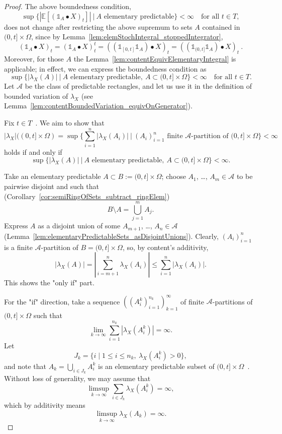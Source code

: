 \begin{proof}
  The above boundedness condition,
\[
\sup
  \Big\{
    |\mathbb{E}[(\mathbb{1}_A \bullet X)_t]|
    \:\Big|\:
    A \text{ elementary predictable}
  \Big\}
  <\infty
  \quad\text{for all } t\in T,
\]
  does not change after restricting the above supremum to sets
  $A$
  contained in $(0, t] \times \Omega$,
  since by
  Lemma~\ref{lem:elemStochIntegral_stoppedIntegrator},
\[
  (\mathbb{1}_A \bullet X)_t
  =
  (\mathbb{1}_A \bullet X)^t_t
  =
  ((\mathbb{1}_{[0, t]}\mathbb{1}_A) \bullet X)_t
  =
  ((\mathbb{1}_{(0, t]}\mathbb{1}_A) \bullet X)_t
  \:.
\]
  Moreover, for those $A$ the Lemma~\ref{lem:contentEquivElementaryIntegral} is applicable;
  in effect, we can express the boundedness condition as
\[
\sup
  \Big\{
    |\lambda_X(A)|
    \:\Big|\:
    A \text{ elementary predictable},\:
    A\subset(0,t]\times\Omega
  \Big\}
  <\infty
  \quad\text{for all } t\in T.
\]
  Let $\mathcal{A}$ be the class of predictable rectangles,
  and let us use it in the definition of bounded variation of $\lambda_X$
  (see Lemma~\ref{lem:contentBoundedVariation_equivOnGenerator}).

  Fix $t\in T$~. We aim to show that
\[
  \vert \lambda_X \vert((0,t]\times\Omega)
  = \sup\Big\{ \sum_{i=1}^n | \lambda_X(A_i)|
  \:\Big|\:
    (A_i)_{i=1}^n \text{ finite } \mathcal{A}\text{-partition of } (0,t]\times\Omega \Big\}
    <\infty
\]
  holds
  if and only if
\[
\sup
  \Big\{
    |\lambda_X(A)|
    \:\Big|\:
    A \text{ elementary predictable},\:
    A\subset(0,t]\times\Omega
  \Big\}
  <\infty.
\]

Take an elementary predictable $A\subset B:=(0,t]\times\Omega$;
choose $A_1$, \ldots, $A_m\in\mathcal{A}$ to be pairwise disjoint
and such that (Corollary~\ref{cor:semiRingOfSets_subtract_ringElem})
\[
    B\setminus A = \bigcup_{j=1}^m A_j.
\]
Express $A$ as a disjoint union of some $A_{m+1}$, \ldots, $A_n\in\mathcal{A}$
(Lemma~\ref{lem:elementaryPredictableSets_asDisjointUnions}).
Clearly, $(A_i)_{i=1}^n$ is a finite $\mathcal{A}$-partition of $B=(0,t]\times\Omega$, so,
by content's additivity,
\[
|\lambda_X(A)|
=
\left|
  \sum_{i=m+1}^n \lambda_X(A_i)
\right|
\le
\sum_{i=1}^n |\lambda_X(A_i)|.
\]
This shows the "only if" part.

For the "if" direction, take a sequence $((A_i^k)_{i=1}^{n_k})_{k=1}^\infty$
of finite $\mathcal{A}$-partitions of $(0,t]\times\Omega$
such that
\[
  \lim_{k\to\infty}
  \sum_{i=1}^{n_k} | \lambda_X(A_i^k)|
  =\infty.
\]
Let
\[
J_k = \{i \mid 1\le i\le n_k, \: \lambda_X(A_i^k) > 0\},
\]
and note that $A_k = \bigcup_{i\in J_k} A_i^k$ is an elementary predictable
subset of $(0,t]\times\Omega$~.
Without loss of generality, we may assume that
\[
  \limsup_{k\to\infty}
  \sum_{i\in J_k} \lambda_X(A_i^k)
  =
  \infty,
\]
which by additivity means
\[
  \limsup_{k\to\infty}
  \lambda_X(A_k)
  =
  \infty.
\]
\end{proof}



